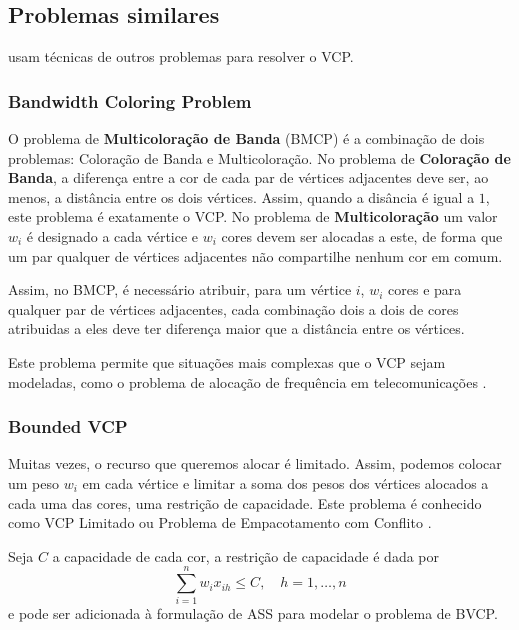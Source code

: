\documentclass[11pt]{article}
\begin{document}
\subsection{Problemas similares}
\label{sec:org8156603}
\textcites{Cornaz2008oneonecorrespondence}[][]{Cornaz2017SolvingVertexColoring} usam técnicas de outros problemas para resolver o VCP.
\subsubsection{Bandwidth Coloring Problem}
\label{sec:orgbdd8f32}
O problema de \textbf{Multicoloração de Banda} (BMCP) é a combinação de dois problemas: Coloração de Banda e Multicoloração.
No problema de \textbf{Coloração de Banda}, a diferença entre a cor de cada par de vértices adjacentes deve ser, ao menos, a distância entre os dois vértices. Assim, quando a disância é igual a \(1\), este problema é exatamente o VCP.
No problema de \textbf{Multicoloração} um valor \(w_i\) é designado a cada vértice e \(w_i\) cores devem ser alocadas a este, de forma que um par qualquer de vértices adjacentes não compartilhe nenhum cor em comum.

Assim, no BMCP, é necessário atribuir, para um vértice \(i\), \(w_i\) cores e para qualquer par de vértices adjacentes, cada combinação dois a dois de cores atribuidas a eles deve ter diferença maior que a distância entre os vértices.

Este problema permite que situações mais complexas que o VCP sejam modeladas, como o problema de alocação de frequência em telecomunicações \autocite{Aardal2007Modelssolutiontechniques}.

\subsubsection{Bounded VCP}
\label{sec:orgf75f49d}
Muitas vezes, o recurso que queremos alocar é limitado. Assim, podemos colocar um peso \(w_i\) em cada vértice e limitar a soma dos pesos dos vértices alocados a cada uma das cores, uma restrição de capacidade.
Este problema é conhecido como VCP Limitado ou Problema de Empacotamento com Conflito \textcite{Connolly1991KnapsackProblemsAlgorithms}.

Seja \(C\) a capacidade de cada cor, a restrição de capacidade é dada por
\[ \sum_{i=1}^n w_i x_{ih} \leq C, \quad h = 1, \dots, n\]
e pode ser adicionada à formulação de ASS para modelar o problema de BVCP.
\end{document}
